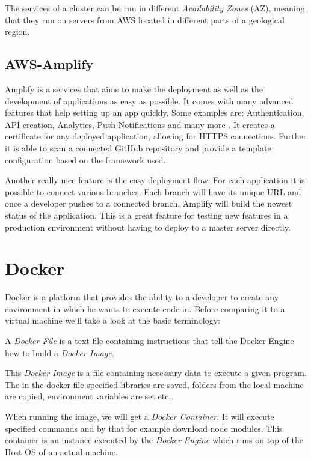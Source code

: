 The services of a cluster can be run in different \emph{Availability Zones} (AZ), meaning that they run on servers from AWS located in different parts of a geological region.

\subsection{AWS-Amplify}
Amplify is a services that aims to make the deployment as well as the development of applications as easy as possible. It comes with many advanced features that help setting up an app quickly. Some examples are: Authentication, API creation, Analytics, Push Notifications and many more \cite{AwsAmplify}. It creates a certificate for any deployed application, allowing for HTTPS connections. Further it is able to scan a connected GitHub repository and provide a template configuration based on the framework used.

Another really nice feature is the easy deployment flow: For each application it is possible to connect various branches. Each branch will have its unique URL and once a developer pushes to a connected branch, Amplify will build the newest status of the application. This is a great feature for testing new features in a production environment without having to deploy to a master server directly.

\section{Docker}
Docker is a platform that provides the ability to a developer to create any environment in which he wants to execute code in.
Before comparing it to a virtual machine we'll take a look at the basic terminology:

A \emph{Docker File} is a text file containing instructions that tell the Docker Engine how to build a \emph{Docker Image}. \cite{NickDocker}

This \emph{Docker Image} is a file containing necessary data to execute a given program. The in the docker file specified libraries are saved, folders from the local machine are copied, environment variables are set etc.. 

When running the image, we will get a \emph{Docker Container}. It will execute specified commands and by that for example download node modules. This container is an instance executed by the \emph{Docker Engine} which runs on top of the Host OS of an actual machine.
\\

